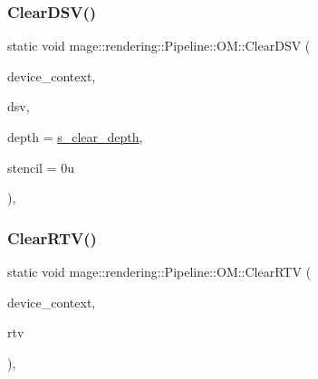 \hypertarget{structmage_1_1rendering_1_1_pipeline_1_1_o_m_ac25264c6f064940f886e86ec9d5fedd4}{}\label{structmage_1_1rendering_1_1_pipeline_1_1_o_m_ac25264c6f064940f886e86ec9d5fedd4} 
\subsubsection{\texorpdfstring{Clear\+D\+S\+V()}{ClearDSV()}}
{\footnotesize\ttfamily static void mage\+::rendering\+::\+Pipeline\+::\+O\+M\+::\+Clear\+D\+SV (\begin{DoxyParamCaption}\item[{I\+D3\+D11\+Device\+Context \&}]{device\+\_\+context,  }\item[{I\+D3\+D11\+Depth\+Stencil\+View $\ast$}]{dsv,  }\item[{\hyperlink{namespacemage_aa97e833b45f06d60a0a9c4fc22ae02c0}{F32}}]{depth = {\ttfamily \hyperlink{structmage_1_1rendering_1_1_pipeline_1_1_o_m_a9eb4fec4852a3ca2e588a90818a706ec}{s\+\_\+clear\+\_\+depth}},  }\item[{\hyperlink{namespacemage_afc638980bc6154f15af5e2d93a0e0ea9}{U8}}]{stencil = {\ttfamily 0u} }\end{DoxyParamCaption})\hspace{0.3cm}{\ttfamily [static]}, {\ttfamily [noexcept]}}

\hypertarget{structmage_1_1rendering_1_1_pipeline_1_1_o_m_a5d33b167e6afea212134dd6f133aef6d}{}\label{structmage_1_1rendering_1_1_pipeline_1_1_o_m_a5d33b167e6afea212134dd6f133aef6d} 
\subsubsection{\texorpdfstring{Clear\+R\+T\+V()}{ClearRTV()}\hspace{0.1cm}{\footnotesize\ttfamily [1/2]}}
{\footnotesize\ttfamily static void mage\+::rendering\+::\+Pipeline\+::\+O\+M\+::\+Clear\+R\+TV (\begin{DoxyParamCaption}\item[{I\+D3\+D11\+Device\+Context \&}]{device\+\_\+context,  }\item[{I\+D3\+D11\+Render\+Target\+View $\ast$}]{rtv }\end{DoxyParamCaption})\hspace{0.3cm}{\ttfamily [static]}, {\ttfamily [noexcept]}}

